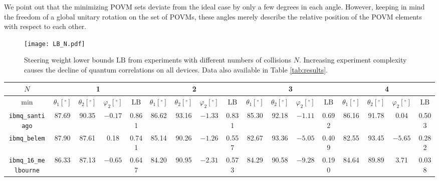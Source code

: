 \documentclass[aps,pra,twocolumn,superscriptaddress,showemail,showpacs,longbibliography]{revtex4-2}
\newcommand{\Op}[1]{\ensuremath{\mathrm{#1}}}
\begin{document}
We point out that the minimizing POVM sets deviate from the ideal case by only a few degrees in each angle. However, keeping in mind the freedom of a global unitary rotation on the set of POVMs, these angles merely describe the relative position of the POVM elements with respect to each other. 
\begin{figure}[t]
    \centering
    \texttt{[image: LB\_N.pdf]}
    \caption{Steering weight lower bounds $\Op{LB}$ from experiments with different numbers of collisions $N$. Increasing experiment complexity causes the decline of quantum correlations on all devices. Data also available in Table \ref{tab:results}.}
    \label{fig:LB}
\end{figure}
\begin{table*}[ht]
    \centering
    \begin{tabular}{c||ccc|c||ccc|c||ccc|c||ccc|c}
        $N$ & \multicolumn{4}{c||}{1} & \multicolumn{4}{c||}{2} & \multicolumn{4}{c||}{3} & \multicolumn{4}{c}{4} \\
        \hline
        $\min$ & $\theta_1 [^\circ]$ & $\theta_2 [^\circ]$ & $\varphi_2 [^\circ]$ & \Op{LB} & $\theta_1 [^\circ]$ & $\theta_2 [^\circ]$ & $\varphi_2 [^\circ]$ & \Op{LB} & $\theta_1 [^\circ]$ & $\theta_2 [^\circ]$ & $\varphi_2 [^\circ]$ & \Op{LB} & $\theta_1 [^\circ]$ & $\theta_2 [^\circ]$ & $\varphi_2 [^\circ]$ & \Op{LB} \\
        \hline
        \texttt{ibmq\_santiago} & 87.69 & 90.35 & $-0.17$ & 0.861 & 86.62 & 93.16 & $-1.33$ & 0.831 & 85.30 & 92.18 & $-1.11$ & 0.692 & 86.16 & 91.78 & 0.04 & 0.503 \\
        \texttt{ibmq\_belem} & 87.90 & 87.61 & 0.18 & 0.741 & 85.14 & 90.26 & $-1.26$ & 0.557 & 82.67 & 93.36 & $-5.05$ & 0.409 & 82.55 & 93.45 & $-5.65$ & 0.282 \\
        \texttt{ibmq\_16\_melbourne} & 86.33 & 87.13 & $-0.65$ & 0.647 & 84.20 & 90.95 & $-2.31$ & 0.573 & 84.29 & 90.58 & $-9.28$ & 0.190 & 84.64 & 89.89 & 3.71 & 0.038
    \end{tabular}
    \caption{Steering weight lower bounds $\Op{LB}$ and angles parametrizing the projective POVM sets, which realize these lower bounds. Each of them is a few degrees away from the ideal case $\mathcal{B}_{\text{id}}$ (up to global unitary rotations). We find presence of steering in all experiments, although with different strengths. In accordance with IBM's reports, we conclude that \texttt{ibmq\_santiago} is the best performing device from our selection, while \texttt{ibmq\_16\_melbourne} performs worst.} 
    \label{tab:results}
\end{table*}
\end{document}
